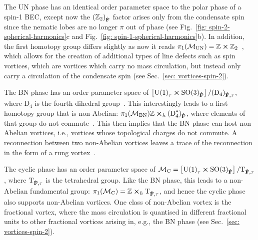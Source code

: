 The UN phase has an identical order parameter space to the polar phase of a
spin-1 BEC, except now the \({(\mathbb{Z}_2)}_{\hat{\vb{F}}}\) factor arises
only from the condensate spin since the nematic lobes are no longer \(\pi \)
out of phase (see Fig.~\ref{fig: spin-2-spherical-harmonics}c and
Fig.~\ref{fig: spin-1-spherical-harmonics}b).
In addition, the first homotopy group differs slightly as now it reads
\(\pi_1(\mathcal{M}_\text{UN}) = \mathbb{Z} \cross
\mathbb{Z}_2\)~\cite{Kobayashi2012}, which allows for the creation of additional
types of line defects such as spin vortices, which are vortices which carry no
mass circulation, but instead only carry a circulation of the condensate spin
(see Sec.~\ref{sec: vortices-spin-2}).

The BN phase has an order parameter space of \(\left[{\text{U}(1)}_\tau \cross
{\text{SO}(3)}_{\hat{\vb{F}}}\right] / {(\text{D}_4)}_{\hat{\vb{F}}, \tau}\),
where \(\text{D}_4\) is the fourth dihedral group~\cite{Kobayashi2012}.
This interestingly leads to a first homotopy group that is non-Abelian:
\(\pi_1(\mathcal{M}_\text{BN})\mathbb{Z} \cross_h
{(\text{D}^\ast_4)}_{\hat{\vb{F}}}\), where elements of that group do not
commute~\cite{Mermin1979}.
This then implies that the BN phase can host non-Abelian vortices, i.e.,
vortices whose topological charges do not commute.
A reconnection between two non-Abelian vortices leaves a trace of the
reconnection in the form of a rung vortex~\cite{Mermin1979}.

The cyclic phase has an order parameter space of \(\mathcal{M}_\text{C} =
\left[{\text{U}(1)}_\tau \cross {\text{SO}(3)}_{\hat{\vb{F}}}\right]
/ \text{T}_{\hat{\vb{F}}, \tau}\), where \(\text{T}_{\hat{\vb{F}}, \tau}\) is
the tetrahedral group.
Like the BN phase, this leads to a non-Abelian fundamental group:
\(\pi_1(\mathcal{M}_\text{C}) = \mathbb{Z} \cross_h
\text{T}_{\hat{\vb{F}}, \tau}\), and hence the cyclic phase also supports
non-Abelian vortices.
One class of non-Abelian vortex is the fractional vortex, where the mass
circulation is quantised in different fractional units to other fractional
vortices arising in, e.g., the BN phase (see Sec.~\ref{sec: vortices-spin-2}).

